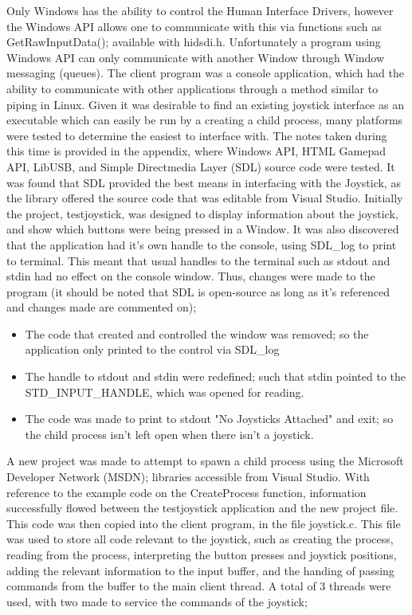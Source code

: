 \documentclass[12pt,openany,a4paper]{book}
\begin{document}
Only Windows has the ability to control the Human Interface Drivers, however the Windows API allows one to communicate with this via functions such as GetRawInputData(); available with hidsdi.h. Unfortunately a program using Windows API can only communicate with another Window through Window messaging (queues). The client program was a console application, which had the ability to communicate with other applications through a method similar to piping in Linux. Given it was desirable to find an existing joystick interface as an executable which can easily be run by a creating a child process, many platforms were tested to determine the easiest to interface with. The notes taken during this time is provided in the appendix, where Windows API, HTML Gamepad API, LibUSB, and Simple Directmedia Layer (SDL) source code were tested. It was found that SDL provided the best means in interfacing with the Joystick, as the library offered the source code that was editable from Visual Studio. Initially the project, testjoystick, was designed to display information about the joystick, and show which buttons were being pressed in a Window. It was also discovered that the application had it's own handle to the console, using SDL\_log to print to terminal. This meant that usual handles to the terminal such as stdout and stdin had no effect on the console window. Thus, changes were made to the program (it should be noted that SDL is open-source as long as it's referenced and changes made are commented on);

\begin{itemize}
	\item The code that created and controlled the window was removed; so the application only printed to the control via SDL\_log
	\item The handle to stdout and stdin were redefined; such that stdin pointed to the STD\_INPUT\_HANDLE, which was opened for reading.
	\item The code was made to print to stdout "No Joysticks Attached" and exit; so the child process isn't left open when there isn't a joystick.
\end{itemize}

A new project was made to attempt to spawn a child process using the Microsoft Developer Network (MSDN); libraries accessible from Visual Studio. With reference to the example code on the CreateProcess function, information successfully flowed between the testjoystick application and the new project file. This code was then copied into the client program, in the file joystick.c. This file was used to store all code relevant to the joystick, such as creating the process, reading from the process, interpreting the button presses and joystick positions, adding the relevant information to the input buffer, and the handing of passing commands from the buffer to the main client thread. A total of 3 threads were used, with two made to service the commands of the joystick;
\end{document}
